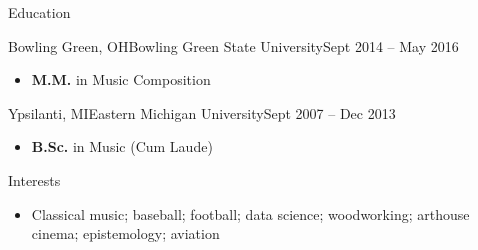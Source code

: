\documentclass[calibri]{mcdowellcv}
\begin{document}
	\begin{cvsection}{Education}
		\begin{cvsubsection}{Bowling Green, OH}{Bowling Green State University}{Sept 2014 -- May 2016}
			\begin{itemize}
				\item \textbf{M.M.} in Music Composition
			\end{itemize}
		\end{cvsubsection}
		\begin{cvsubsection}{Ypsilanti, MI}{Eastern Michigan University}{Sept 2007 -- Dec 2013}
			\begin{itemize}
				\item \textbf{B.Sc.} in Music (Cum Laude)
			\end{itemize}
		\end{cvsubsection}
	\end{cvsection}

	\begin{cvsection}{Interests}
		\begin{cvsubsection}{}{}{}
			\begin{itemize}
				\item Classical music; baseball; football; data science; woodworking; arthouse cinema; epistemology; aviation
			\end{itemize}
		\end{cvsubsection}
	\end{cvsection}
\end{document}
